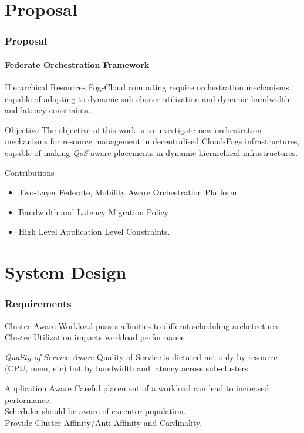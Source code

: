 \documentclass{beamer}
\begin{document}
\section{Proposal}
\begin{frame}
	\frametitle{Proposal}
	\framesubtitle{Federate Orchestration Framework}
	\begin{block}{Hierarchical Resources}
		Fog-Cloud computing require orchestration
mechanisms capable of adapting to dynamic
sub-cluster 
		utilization and dynamic bandwidth
and latency constraints.
	\end{block}

	\begin{alertblock}{Objective}
		The objective of this work is to investigate new orchestration mechanisms for resource management in 
		decentralised Cloud-Fogs infrastructures, capable of making \textit{QoS} aware placements in dynamic hierarchical infrastructures. 
	\end{alertblock}

	\begin{exampleblock}{Contributions}
		\begin{itemize}
			\item Two-Layer Federate, Mobility Aware Orchestration Platform
			\item Bandwidth and Latency Migration Policy
			\item High Level Application Level Constraints.
		\end{itemize}
	\end{exampleblock}
\end{frame}


\section{System Design}
\begin{frame}
	\frametitle{Requirements}
	\begin{block}{Cluster Aware}
		Workload posses affinities to differnt scheduling archetectures\\
		Cluster Utilization impacts workload performance
	\end{block}
	\begin{block}{\textit{Quality of Service Aware}}
		Quality of Service is dictated not only by resource (CPU, mem, etc) but by bandwidth and latency across sub-clusters
	\end{block}
	\begin{block}{Application Aware}
		Careful placement of a workload can lead to increased performance.\\
		Scheduler should be aware of executor population.\\
		Provide Cluster Affinity/Anti-Affinity and Cardinality.
	\end{block}
\end{frame}
\end{document}
